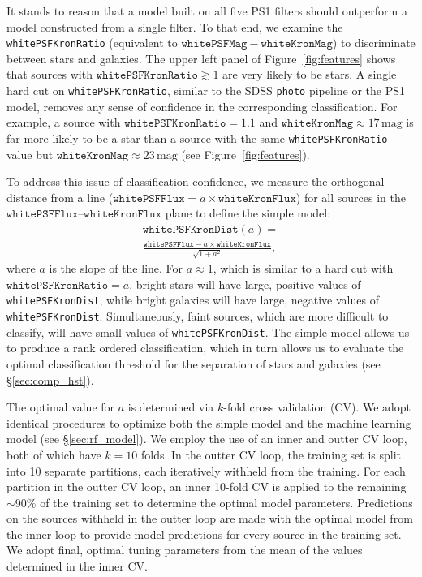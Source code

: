 \documentclass[twocolumn]{aastex62}
\begin{document}
It stands to reason that a model built on all five PS1 filters should outperform a model constructed from a single filter. To that end, we examine the \texttt{whitePSFKronRatio} (equivalent to $\mathtt{whitePSFMag} - \mathtt{whiteKronMag}$) to discriminate between stars and galaxies. The upper left panel of Figure~\ref{fig:features} shows that sources with $\mathtt{whitePSFKronRatio} \gtrsim 1$ are very likely to be stars. A single hard cut on \texttt{whitePSFKronRatio}, similar to the SDSS \texttt{photo} pipeline or the PS1 model, removes any sense of confidence in the corresponding classification. For example, a source with $\mathtt{whitePSFKronRatio} = 1.1$ and $\mathtt{whiteKronMag} \approx 17\,\mathrm{mag}$ is far more likely to be a star than a source with the same \texttt{whitePSFKronRatio} value but $\mathtt{whiteKronMag} \approx 23\,\mathrm{mag}$ (see Figure~\ref{fig:features}).

To address this issue of classification confidence, we measure the
orthogonal distance from a line ($\mathtt{whitePSFFlux} = a\times
\mathtt{whiteKronFlux}$) for all sources in the
$\mathtt{whitePSFFlux}$--$\mathtt{whiteKronFlux}$ plane to define the simple model:
%
\begin{multline}
 \mathtt{whitePSFKronDist}(a) = \\
 \frac{\mathtt{whitePSFFlux} - a\times\mathtt{whiteKronFlux}}{ \sqrt{1 + a^2}},
 \label{eqn:psfkrondist}
\end{multline}
%
where $a$ is the slope of the line. For $a \approx 1$, which is similar to a
hard cut with $\mathtt{whitePSFKronRatio} = a$, bright stars will have
large, positive values of \texttt{whitePSFKronDist}, while bright galaxies
will have large, negative values of \texttt{whitePSFKronDist}.
Simultaneously, faint sources, which are more difficult to classify, will
have small values of \texttt{whitePSFKronDist}. The simple model allows us
to produce a rank ordered classification, which in turn allows us to
evaluate the optimal classification threshold for the separation of stars
and galaxies (see \S\ref{sec:comp_hst}).

The optimal value for $a$ is determined via $k$-fold cross validation (CV).
We adopt identical procedures to optimize both the simple model and the
machine learning model (see \S\ref{sec:rf_model}). We employ the use of an
inner and outter CV loop, both of which have $k = 10$ folds. In the outter
CV loop, the training set is split into 10 separate partitions, each
iteratively withheld from the training. For each partition in the outter CV
loop, an inner 10-fold CV is applied to the remaining $\sim$90\% of the
training set to determine the optimal model parameters. Predictions on the
sources withheld in the outter loop are made with the optimal model from the
inner loop to provide model predictions for every source in the training
set. We adopt final, optimal tuning parameters from the mean of the values
determined in the inner CV.
\end{document}
